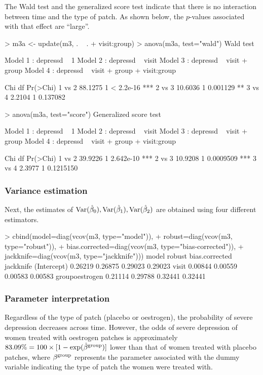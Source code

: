 The Wald test and the generalized score test indicate that there is no interaction between time and the type of patch. As shown below, the $p$-values associated with that effect are ``large''.
\begin{example}
> m3a <- update(m3, . ~ . + visit:group)
> anova(m3a, test="wald")
Wald test 

Model 1 :  depressd ~ 1 
Model 2 :  depressd ~ visit 
Model 3 :  depressd ~ visit + group 
Model 4 :  depressd ~ visit + group + visit:group 

         Chi    df   Pr(>Chi)    
1 vs 2 88.1275   1  < 2.2e-16 ***
2 vs 3 10.6036   1   0.001129 ** 
3 vs 4  2.2104   1   0.137082

> anova(m3a, test="score")
Generalized score test 

Model 1 :  depressd ~ 1 
Model 2 :  depressd ~ visit 
Model 3 :  depressd ~ visit + group 
Model 4 :  depressd ~ visit + group + visit:group 

         Chi    df   Pr(>Chi)    
1 vs 2 39.9226   1  2.642e-10 ***
2 vs 3 10.9208   1  0.0009509 ***
3 vs 4  2.3977   1  0.1215150   
\end{example}

\subsubsection{Variance estimation}
Next, the estimates of ${\rm Var}(\hat{\beta}_0),{\rm Var}(\hat{\beta}_1),{\rm Var}(\hat{\beta}_2)$ are obtained using four different estimators.
\begin{example}
> cbind(model=diag(vcov(m3, type="model")), 
+       robust=diag(vcov(m3, type="robust")), 
+       bias.corrected=diag(vcov(m3, type="bias-corrected")),
+       jackknife=diag(vcov(m3, type="jackknife")))
                 model  robust bias.corrected jackknife
(Intercept)    0.26219 0.26875        0.29023   0.29023
visit          0.00844 0.00559        0.00583   0.00583
groupoestrogen 0.21114 0.29788        0.32441   0.32441
\end{example}

\subsubsection{Parameter interpretation}
Regardless of the type of patch (placebo or oestrogen), the probability of severe depression decreases across time. However, the odds of severe depression of women treated with oestrogen patches is approximately $83.09\% = 100\times[1-\exp(\hat{\beta}^{\rm group})]$ lower than that of women treated with placebo patches, where $\beta^{\rm group}$ represents the parameter associated with the dummy variable indicating the type of patch the women were treated with.

